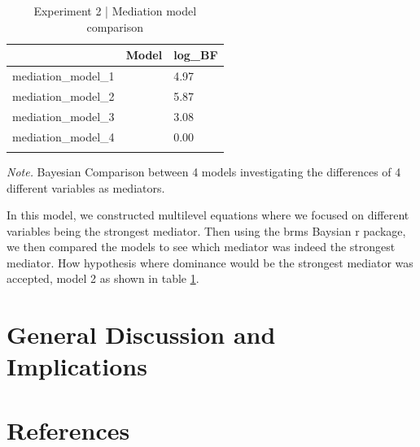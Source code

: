 \documentclass[
  donotrepeattitle,doc, 12pt, a4paper,floatsintext]{apa7}
\begin{document}
\begin{table}[tbp]

\begin{center}
\begin{threeparttable}

\caption{\label{tab:mediationComparisonExp2}Experiment 2 | Mediation model comparison}

\begin{tabular}{lll}
\toprule
 & \multicolumn{1}{c}{Model} & \multicolumn{1}{c}{log\_BF}\\
\midrule
mediation\_model\_1 &  & 4.97\\
mediation\_model\_2 &  & 5.87\\
mediation\_model\_3 &  & 3.08\\
mediation\_model\_4 &  & 0.00\\
\bottomrule
\addlinespace
\end{tabular}

\begin{tablenotes}[para]
\normalsize{\textit{Note.} Bayesian Comparison between 4 models investigating the differences of 4 different variables as mediators.}
\end{tablenotes}

\end{threeparttable}
\end{center}

\end{table}

In this model, we constructed multilevel equations where we focused on different variables being the strongest mediator. Then using the brms Baysian r package, we then compared the models to see which mediator was indeed the strongest mediator. How hypothesis where dominance would be the strongest mediator was accepted, model 2 as shown in table \ref{tab:mediationComparisonExp2}.

\hypertarget{general-discussion-and-implications}{%
\section{General Discussion and Implications}\label{general-discussion-and-implications}}

\newpage

\hypertarget{references}{%
\section{References}\label{references}}
\end{document}
